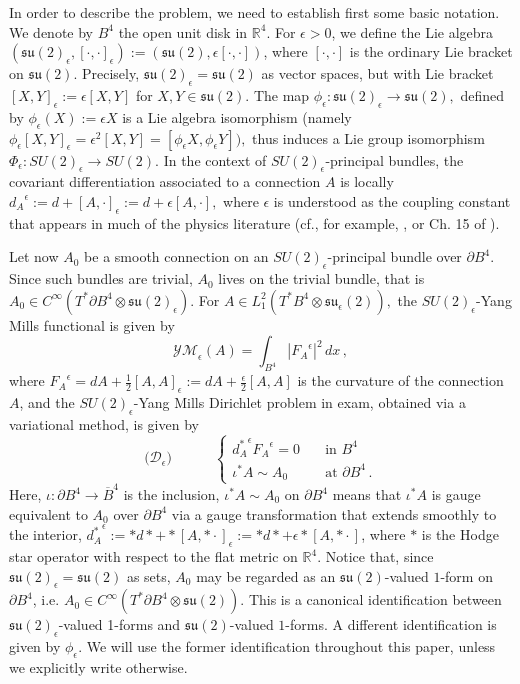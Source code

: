 \documentclass[11pt]{article}
\numberwithin{equation}{section} \setlength{\topmargin}{-35pt}
\newcommand{\R}{\mathbb{R}}
\newcommand{\YMe}{\mathcal{YM}_{\epsilon}}
\begin{document}
In order to describe the problem, we need to establish first some
basic notation. We denote by $B^4$ the open unit disk in $\R^4.$ For
$\epsilon >0$, we define the Lie algebra
$(\mathfrak{su}(2)_{\epsilon},[\cdot,\cdot]_{\epsilon})
:=(\mathfrak{su}(2),\epsilon[\cdot,\cdot])$, where $[\cdot,\cdot]$
is the ordinary Lie bracket on $\mathfrak{su}(2)$. Precisely,
$\mathfrak{su}(2)_{\epsilon}=\mathfrak{su}(2)$ as vector spaces, but
with Lie bracket $[X,Y]_{\epsilon}:=\epsilon [X,Y]$ for
$X,Y\in\mathfrak{su}(2)$. The map
$\phi_{\epsilon}:\mathfrak{su}(2)_{\epsilon}\to\mathfrak{su}(2),$
defined by $\phi_{\epsilon}(X):=\epsilon X$ is a Lie algebra
isomorphism (namely $\phi_{\epsilon} [X,Y]_\epsilon = \epsilon^2
[X,Y] = [\phi_\epsilon X,\phi_\epsilon Y]),$ thus induces a Lie
group isomorphism $\Phi_{\epsilon}:SU(2)_{\epsilon}\to SU(2)$. In
the context of $SU(2)_{\epsilon}$-principal bundles,  the covariant
differentiation associated to a connection $A$ is locally
${d_A}^\epsilon := d + [A, \cdot]_\epsilon := d + \epsilon [A,
\cdot],$ where $\epsilon$ is understood as the coupling constant
that appears in much of the physics literature (cf., for example,
\cite{Ry}, or Ch. 15 of \cite{Wei}).

\medskip
Let now $A_0$ be a smooth connection on an
$SU(2)_{\epsilon}$-principal bundle over $\partial B^4$. Since such
bundles are trivial, $A_0$ lives on the trivial bundle, that is
$A_0\in C^{\infty}(T^{\ast}\partial
B^4\otimes\mathfrak{su}(2)_\epsilon).$ For $A\in L^2_1(T^*B^4\otimes
\mathfrak{su}_\epsilon(2)),$ the $SU(2)_{\epsilon}$-Yang Mills
functional is given by
\begin{equation}
\label{1} \YMe(A)=\int_{B^4}|{F_A}^\epsilon|^2\,dx\,,
\end{equation}
where
${F_A}^\epsilon=dA+\frac{1}{2}[A,A]_{\epsilon}:=dA+\frac{\epsilon}{2}[A,A]$
is the curvature of the connection $A$, and the
$SU(2)_{\epsilon}$-Yang Mills Dirichlet problem in exam, obtained
via a variational method, is given by
$$
\bigl(\mathcal{D}_{\epsilon}\bigr)\quad\qquad\left\{\begin{array}{ll}
{d_A^{\ast}}^\epsilon {F_A}^\epsilon=0\quad&\mbox{in } B^4\\
\iota^{\ast}A\sim A_0\quad&\mbox{at } \partial B^4\,.
\end{array}\right.
$$
Here, $\iota:\partial B^4\to\overline{B}^4$ is the inclusion,
$\iota^{\ast}A\sim A_0$ on $\partial B^4$ means that $\iota^{\ast}A$
is gauge equivalent to $A_0$ over $\partial B^4$ via a gauge
transformation that extends smoothly to the interior,
${d_A^{\ast}}^\epsilon:=\ast
d\ast+\ast[A,\ast\cdot]_{\epsilon}:=\ast
d\ast+\epsilon\ast[A,\ast\cdot]$, where $\ast$ is the Hodge star
operator with respect to the flat metric on $\R^4$. Notice that,
since $\mathfrak{su}(2)_{\epsilon}=\mathfrak{su}(2)$ as sets, $A_0$
may be regarded as an $\mathfrak{su}(2)$-valued $1$-form on
$\partial B^4$, i.e. $A_0\in C^{\infty}(T^{\ast}\partial
B^4\otimes\mathfrak{su}(2))$. This is a canonical identification
between $\mathfrak{su}(2)_{\epsilon}$-valued 1-forms and
$\mathfrak{su}(2)$-valued $1$-forms. A different identification is
given by $\phi_{\epsilon}$. We will use the former identification
throughout this paper, unless we explicitly write otherwise.
\end{document}
